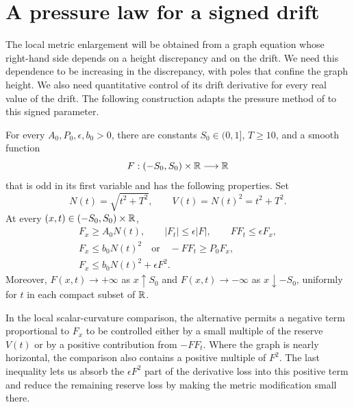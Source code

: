 \section{A pressure law for a signed drift}\label{sec:pressure}

The local metric enlargement will be obtained from a graph equation whose
right-hand side depends on a height discrepancy and on the drift.  We need
this dependence to be increasing in the discrepancy, with poles that confine
the graph height.  We also need quantitative control of its drift derivative
for every real value of the drift.  The following construction adapts the
pressure method of \cite[Theorem~2.1]{OpenAIWidth} to this signed parameter.

\begin{proposition}\label{pressure:law}
For every \(A_0,P_0,\epsilon,b_0>0\), there are constants
\(S_0\in(0,1]\), \(T\ge10\), and a smooth function
\[
 F:(-S_0,S_0)\times\mathbb R\longrightarrow\mathbb R
\]
that is odd in its first variable and has the following properties.  Set
\begin{equation}\label{pressure:reserve}
 N(t)=\sqrt{t^2+T^2},\qquad V(t)=N(t)^2=t^2+T^2.
\end{equation}
At every \((x,t)\in(-S_0,S_0)\times\mathbb R\),
\begin{equation}\label{pressure:bounds}
 \begin{gathered}
 F_x\ge A_0N(t),\qquad |F_t|\le\epsilon|F|,
       \qquad FF_t\le\epsilon F_x,\\
 F_x\le b_0N(t)^2\quad\text{or}\quad -FF_t\ge P_0F_x,\\
 F_x\le b_0N(t)^2+\epsilon F^2.
 \end{gathered}
\end{equation}
Moreover, \(F(x,t)\to+\infty\) as \(x\uparrow S_0\) and
\(F(x,t)\to-\infty\) as \(x\downarrow-S_0\), uniformly for \(t\)
in each compact subset of \(\mathbb R\).
\end{proposition}

In the local scalar-curvature comparison, the alternative permits a
negative term proportional to \(F_x\) to be controlled either by a small
multiple of the reserve \(V(t)\) or by a positive contribution from
\(-FF_t\).  Where the graph is nearly horizontal, the comparison also
contains a positive multiple of \(F^2\).  The last inequality lets us
absorb the \(\epsilon F^2\) part of the derivative loss into this positive
term and reduce the remaining reserve loss by making the metric
modification small there.

